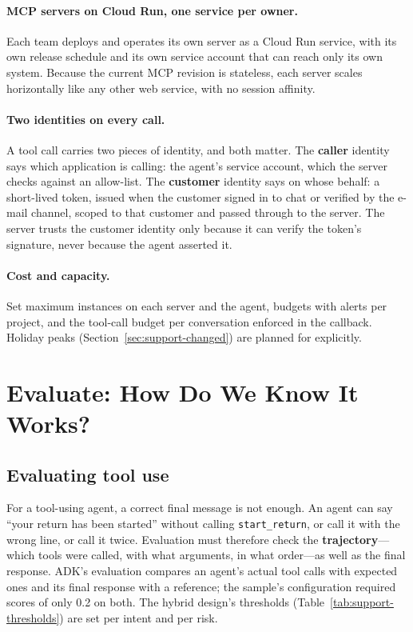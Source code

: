 \paragraph{MCP servers on Cloud Run, one service per owner.} Each team deploys and operates its own server as a Cloud Run service, with its own release schedule and its own service account that can reach only its own system. Because the current MCP revision is stateless, each server scales horizontally like any other web service, with no session affinity.

\paragraph{Two identities on every call.} A tool call carries two pieces of identity, and both matter. The \textbf{caller} identity says which application is calling: the agent's service account, which the server checks against an allow-list. The \textbf{customer} identity says on whose behalf: a short-lived token, issued when the customer signed in to chat or verified by the e-mail channel, scoped to that customer and passed through to the server. The server trusts the customer identity only because it can verify the token's signature, never because the agent asserted it.

\paragraph{Cost and capacity.} Set maximum instances on each server and the agent, budgets with alerts per project, and the tool-call budget per conversation enforced in the callback. Holiday peaks (Section~\ref{sec:support-changed}) are planned for explicitly.

\section{Evaluate: How Do We Know It Works?}
\label{sec:support-evaluate}

\subsection{Evaluating tool use}

For a tool-using agent, a correct final message is not enough. An agent can say ``your return has been started'' without calling \texttt{start\_return}, or call it with the wrong line, or call it twice. Evaluation must therefore check the \textbf{trajectory}---which tools were called, with what arguments, in what order---as well as the final response. ADK's evaluation compares an agent's actual tool calls with expected ones and its final response with a reference; the sample's configuration required scores of only 0.2 on both. The hybrid design's thresholds (Table~\ref{tab:support-thresholds}) are set per intent and per risk.

